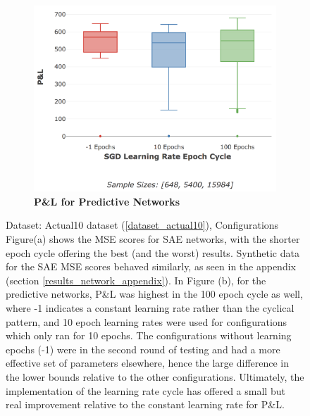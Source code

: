\documentclass[a4paper,11pt,oneside]{article}
\theoremstyle{plain}
\theoremstyle{definition}
\begin{document}
\begin{figure}[H]
\begin{subfigure}{.5\textwidth}
		\includegraphics[scale=0.25]{images/results/network/lr/actual_pl_lr_epochs.png}
		\caption{\textbf{P\&L for Predictive Networks} 
			\newline }
		\label{figure-actual_pl_lr_epochs}
	\end{subfigure}
	\caption{Dataset: Actual10 dataset (\ref{dataset_actual10}), Configurations
		\newline Figure(a) shows the MSE scores for SAE networks, with the shorter epoch cycle offering the best (and the worst) results. Synthetic data for the SAE MSE scores behaved similarly, as seen in the appendix (section \ref{results_network_appendix}). 
		\newline In Figure (b), for the predictive networks, P\&L was highest in the 100 epoch cycle as well, where -1 indicates a constant learning rate rather than the cyclical pattern, and 10 epoch learning rates were used for configurations which only ran for 10 epochs. The configurations without learning epochs (-1) were in the second round of testing and had a more effective set of parameters elsewhere, hence the large difference in the lower bounds relative to the other configurations. Ultimately, the implementation of the learning rate cycle has offered a small but real improvement relative to the constant learning rate for P\&L.}
	\label{figure-epochs_lr}
\end{figure}
\end{document}
